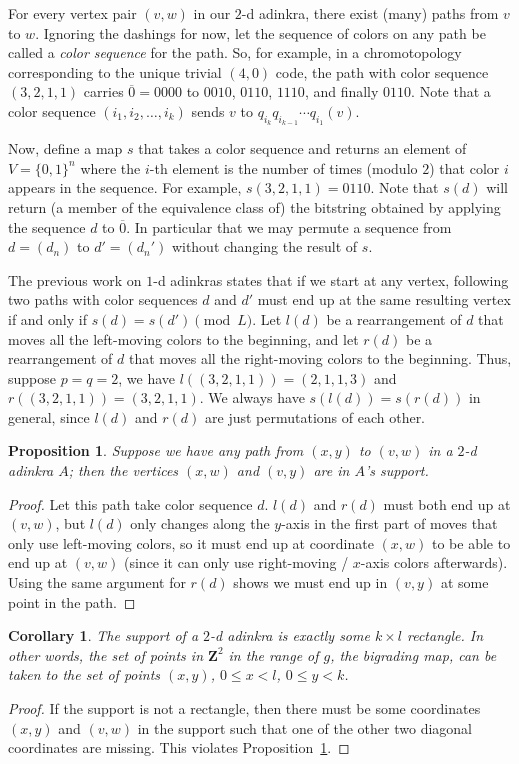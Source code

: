 \documentclass[12pt,twoside,singlespace]{article}
\numberwithin{equation}{section}
\newtheorem{cor}[equation]{Corollary}
\newtheorem{prop}[equation]{Proposition}
\theoremstyle{definition}
\newcommand{\ZZ}{\mathbf{Z}}
\begin{document}
For every vertex pair $(v,w)$ in our $2$-d adinkra, there exist (many) paths from $v$ to $w$. Ignoring the dashings for now, let the sequence of colors on any path be called a \emph{color sequence} for the path. So, for example, in a chromotopology corresponding to the unique trivial $(4,0)$ code, the path with color sequence $(3,2,1,1)$ carries $\overline{0} = 0000$ to $0010$, $0110$, $1110$, and finally $0110$. Note that a color sequence $(i_1, i_2, \ldots, i_k)$ sends $v$ to $q_{i_k} q_{i_{k-1}} \cdots q_{i_1} (v)$.

Now, define a map $s$ that takes a color sequence and returns an element of $V = \{0,1\}^n$ where the $i$-th element is the number of times (modulo $2$) that color $i$ appears in the sequence. For example, $s(3,2,1,1) = 0110$. Note that $s(d)$ will return (a member of the equivalence class of) the bitstring obtained by applying the sequence $d$ to $\overline{0}$.  In particular that we may permute a sequence from $d = (d_n)$ to $d' = (d_n')$ without changing the result of $s$. 

The previous work on $1$-d adinkras states that if we start at any vertex, following two paths with color sequences $d$ and $d'$ must end up at the same resulting vertex if and only if $s(d) = s(d') \pmod{L}$. Let $l(d)$ be a rearrangement of $d$ that moves all the left-moving colors to the beginning, and let $r(d)$ be a rearrangement of $d$ that moves all the right-moving colors to the beginning. Thus, suppose $p = q = 2$, we have $l((3,2,1,1)) = (2,1,1,3)$ and $r((3,2,1,1)) = (3,2,1,1)$. We always have $s(l(d)) = s(r(d))$ in general, since $l(d)$ and $r(d)$ are just permutations of each other.

\begin{prop}
\label{prop:rectangle-completion}
Suppose we have any path from $(x,y)$ to $(v,w)$ in a $2$-d adinkra $A$; then the vertices $(x,w)$ and $(v,y)$ are in $A$'s support.
\end{prop}
\begin{proof}
Let this path take color sequence $d$. $l(d)$ and $r(d)$ must both end up at $(v,w)$, but $l(d)$ only changes along the $y$-axis in the first part of moves that only use left-moving colors, so it must end up at coordinate $(x,w)$ to be able to end up at $(v,w)$ (since it can only use right-moving / $x$-axis colors afterwards). Using the same argument for $r(d)$ shows we must end up in $(v,y)$ at some point in the path.
\end{proof}

\begin{cor}
\label{cor:rectangle}
The support of a $2$-d adinkra is exactly some $k \times l$ rectangle. In other words, the set of points in $\ZZ^2$ in the range of $g$, the bigrading map, can be taken to the set of points $(x,y)$, $0 \leq x < l$, $0 \leq y < k$.
\end{cor}
\begin{proof}
If the support is not a rectangle, then there must be some coordinates $(x,y)$ and $(v,w)$ in the support such that one of the other two diagonal coordinates are missing. This violates Proposition~\ref{prop:rectangle-completion}.
\end{proof}
\end{document}
